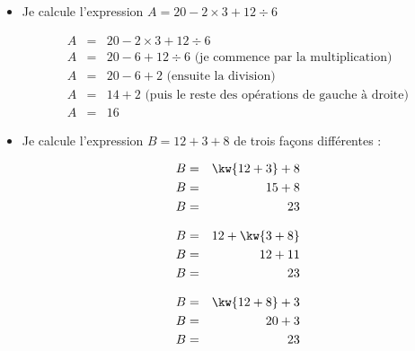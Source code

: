 \begin{myexs}
	\begin{itemize}
		\item Je calcule l'expression $A= 20 - 2 \times 3 + 12 \div 6$
		
		\vspace*{-0.5cm}
		
		\begin{eqnarray*}
			A &=& 20 - 2 \times 3 + 12 \div 6 \\
			A &=& 20 - 6 + 12 \div 6 \text{ (je commence par la multiplication) }\\
			A &=& 20 - 6 + 2 \text{ (ensuite la division)} \\
			A &=& 14 + 2 \text{ (puis le reste des opérations de gauche à droite)}\\
			A &=& 16
		\end{eqnarray*}
		
		\item Je calcule l'expression $B= 12 + 3 +8$ de trois façons différentes :
		
		\vspace*{-0.5cm}
		\begin{multicols}{3}
			\begin{eqnarray*}
				B &=& \kw{12 + 3} + 8 \\
				B &=& 15 + 8 \\
				B &=& 23
			\end{eqnarray*}
			
			\begin{eqnarray*}
				B &=& 12 + \kw{3 + 8} \\
				B &=& 12 + 11 \\
				B &=& 23
			\end{eqnarray*}
			
			\begin{eqnarray*}
				B &=& \kw{12 + 8} + 3 \\
				B &=& 20 + 3 \\
				B &=& 23
			\end{eqnarray*}
		\end{multicols}
		
	\end{itemize}
\end{myexs}
